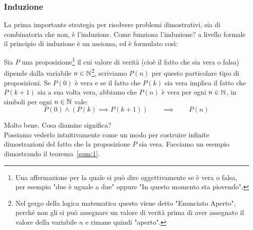 \documentclass[11pt]{scrartcl}
\begin{document}
	\subsubsection{Induzione}
	La prima importante strategia per risolvere problemi dimostrativi, sia di combinatoria che non, è l'induzione.
	Come funziona l'induzione? a livello formale il principio di induzione è un assioma, ed è formulato così:
	\begin{proposition}[Induzione]
		Sia $P$ una proposizione\footnote{Una affermazione per la quale si può dire oggettivamente se è vera o falsa, per esempio "due è uguale a due" oppure "In questo momento sta piovendo".} il cui valore di verità (cioè il fatto che sia vera o falsa) dipende dalla variabile $n\in\mathbb N$\footnote{Nel gergo della logica matematica questo viene detto "Enunciato Aperto", perché non gli si può assegnare un valore di verità prima di aver assegnato il valore della variabile $n$ e rimane quindi "aperto".}, scriviamo $P(n)$ per questo particolare tipo di proposizioni. Se $P(0)$ è vera e se il fatto che $P(k)$ sia vera implica il fatto che $P(k+1)$ sia a sua volta vera, abbiamo che $P(n)$ è vera per ogni $n\in\mathbb N$, in simboli per ogni $n\in\mathbb N$ vale:
		$$P(0) \land (P(k)\implies P(k+1)) \qquad \implies \qquad P(n) $$
	\end{proposition}
	Molto bene. Cosa diamine significa? \\
	Possiamo vederlo intuitivamente come un modo per costruire infinite dimostrazioni del fatto che la proposizione $P$ sia vera. Facciamo un esempio dimostrando il teorema~\ref{sum:1}.
\end{document}
